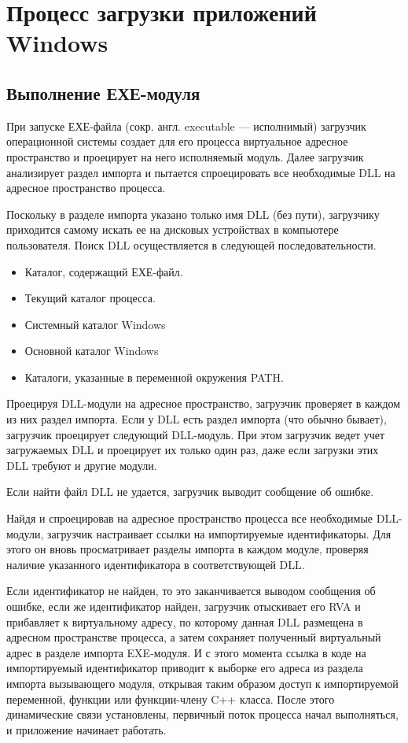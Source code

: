 \newpage
\section{Процесс загрузки приложений Windows}

\subsection{Выполнение ЕХЕ-модуля}

При запуске ЕХЕ-файла (сокр. англ. executable — исполнимый) загрузчик операционной системы создает для его процесса виртуальное адресное пространство и проецирует на него исполняемый модуль. Далее загрузчик анализирует раздел импорта и пытается спроецировать все необходимые DLL на адресное пространство процесса.

Поскольку в разделе импорта указано только имя DLL (без пути), загрузчику приходится самому искать ее на дисковых устройствах в компьютере пользователя. Поиск DLL осуществляется в следующей последовательности.

\begin{itemize}
\item Каталог, содержащий ЕХЕ-файл.
\item Текущий каталог процесса.
\item Системный каталог Windows
\item Основной каталог Windows
\item Каталоги, указанные в переменной окружения PATH.
\end{itemize}

Проецируя DLL-модули на адресное пространство, загрузчик проверяет в каждом из них раздел импорта. Если у DLL есть раздел импорта (что обычно бывает), загрузчик проецирует следующий DLL-модуль. При этом загрузчик ведет учет загружаемых DLL и проецирует их только один раз, даже если загрузки этих DLL требуют и другие модули.

Если найти файл DLL не удается, загрузчик выводит сообщение об ошибке.

Найдя и спроецировав на адресное пространство процесса все необходимые DLL-модули, загрузчик настраивает ссылки на импортируемые идентификаторы. Для этого он вновь просматривает разделы импорта в каждом модуле, проверяя наличие указанного идентификатора в соответствующей DLL.

Если идентификатор не найден, то это заканчивается выводом сообщения об ошибке, если же идентификатор найден, загрузчик отыскивает его RVA и прибавляет к виртуальному адресу, по которому данная DLL размещена в адресном пространстве процесса, а затем сохраняет полученный виртуальный адрес в разделе импорта EXE-модуля. И с этого момента ссылка в коде на импортируемый идентификатор приводит к выборке его адреса из раздела импорта вызывающего модуля, открывая таким образом доступ к импортируемой переменной, функции или функции-члену C++ класса. После этого динамические связи установлены, первичный поток процесса начал выполняться, и приложение начинает работать\cite{Cit4}.

